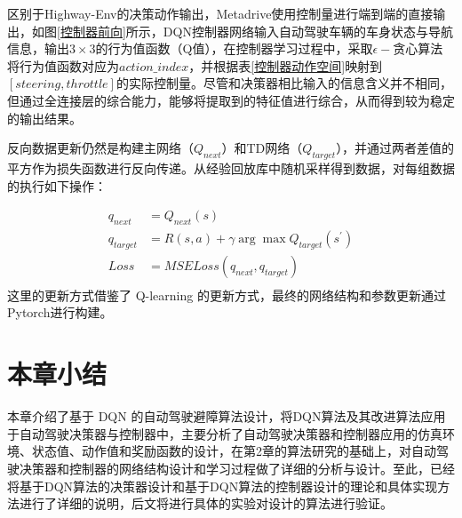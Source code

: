 区别于Highway-Env的决策动作输出，Metadrive使用控制量进行端到端的直接输出，如图\ref{控制器前向}所示，DQN控制器网络输入自动驾驶车辆的车身状态与导航信息，输出$3 \times 3$的行为值函数（Q值），在控制器学习过程中，采取$\epsilon-$贪心算法将行为值函数对应为$action\_index$，并根据表\ref{控制器动作空间}映射到$[steering, throttle]$的实际控制量。尽管和决策器相比输入的信息含义并不相同，但通过全连接层的综合能力，能够将提取到的特征值进行综合，从而得到较为稳定的输出结果。

反向数据更新仍然是构建主网络（$Q_{next}$）和TD网络（$Q_{target}$），并通过两者差值的平方作为损失函数进行反向传递。从经验回放库中随机采样得到数据，对每组数据的执行如下操作：

\begin{equation}
    \begin{aligned}
        q_{next} &= Q_{next}(s)\\
        q_{target} &= R(s,a) + \gamma \arg \max Q_{target}(s^{'})\\
        Loss &= MSELoss(q_{next},q_{target})\\
    \end{aligned}
\end{equation}
这里的更新方式借鉴了 Q-learning 的更新方式，最终的网络结构和参数更新通过Pytorch进行构建。

\section{本章小结} %

本章介绍了基于 DQN 的自动驾驶避障算法设计，将DQN算法及其改进算法应用于自动驾驶决策器与控制器中，主要分析了自动驾驶决策器和控制器应用的仿真环境、状态值、动作值和奖励函数的设计，在第2章的算法研究的基础上，对自动驾驶决策器和控制器的网络结构设计和学习过程做了详细的分析与设计。至此，已经将基于DQN算法的决策器设计和基于DQN算法的控制器设计的理论和具体实现方法进行了详细的说明，后文将进行具体的实验对设计的算法进行验证。
